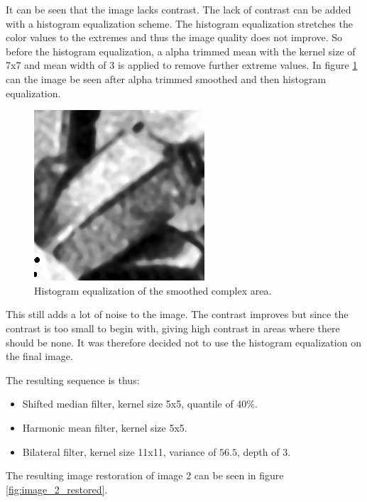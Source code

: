 It can be seen that the image lacks contrast.
The lack of contrast can be added with a histogram equalization scheme.
The histogram equalization stretches the color values to the extremes and thus the image quality does not improve.
So before the histogram equalization, a alpha trimmed mean with the kernel size of 7x7 and mean width of 3 is applied to remove further extreme values.
In figure \ref{fig:complex2_histeq_smoothed} can the image be seen after alpha trimmed smoothed and then histogram equalization.

\begin{figure}[H]
\centering
\includegraphics[width = \cutOutWidth]{graphics/complex2_histeq_smoothed.png}
\caption{Histogram equalization of the smoothed complex area.}
\label{fig:complex2_histeq_smoothed}
\end{figure}

This still adds a lot of noise to the image. 
The contrast improves but since the contrast is too small to begin with, giving high contrast in areas where there should be none.
It was therefore decided not to use the histogram equalization on the final image.

The resulting sequence is thus:
\begin{itemize}
 \item Shifted median filter, kernel size 5x5, quantile of 40\%.
 \item Harmonic mean filter, kernel size 5x5.
 \item Bilateral filter, kernel size 11x11, variance of $56.5$, depth of 3.
\end{itemize}
The resulting image restoration of image 2 can be seen in figure \ref{fig:image_2_restored}.


